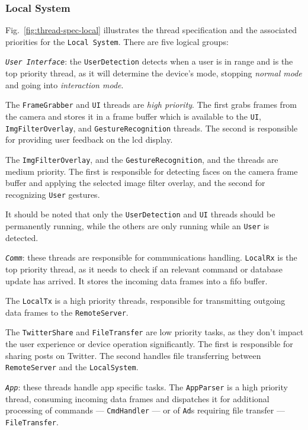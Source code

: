 \subsubsection{Local System}
\label{sec:local-system-2}
%
Fig.~\ref{fig:thread-spec-local} illustrates the thread specification and the
associated priorities for the \texttt{Local System}. There are five logical
groups:
\begin{enum-c}
\item
  \emph{\texttt{User Interface}}: the \texttt{UserDetection} detects when a user
  is in range and is the top priority
  thread, as it will determine the device's mode, stopping \emph{normal mode}
  and going into \emph{interaction mode}.

  The \texttt{FrameGrabber} and \texttt{UI} threads are \emph{high
    priority}. The first grabs frames from the camera and stores it in a frame
  buffer which is available to the \texttt{UI}, \texttt{ImgFilterOverlay}, and
  \texttt{GestureRecognition} threads. The second is
  responsible for providing user feedback on the \gls{lcd} display.

  The \texttt{ImgFilterOverlay}, and the \texttt{GestureRecognition}, and the
  threads are medium priority. The first is responsible
  for detecting faces on the camera frame buffer and applying the selected image
  filter overlay, and the second for recognizing \texttt{User} gestures.

  It should be noted that only the \texttt{UserDetection} and \texttt{UI}
  threads should be permanently running, while the others are only running while
  an \texttt{User} is detected.
\item
  \emph{\texttt{Comm}}: these threads are responsible for communications
  handling.
  \texttt{LocalRx} is the top priority thread, as it needs to check if an
  relevant command or database update has arrived. It stores the incoming data
  frames into a \gls{fifo} buffer.

  The \texttt{LocalTx} is a high priority threads, responsible for
  transmitting outgoing data frames to the \texttt{RemoteServer}.

  The \texttt{TwitterShare} and \texttt{FileTransfer} are low priority tasks, as
  they don't impact the user experience or device operation significantly. The
  first is responsible for sharing posts on Twitter. The second handles file
  transferring between \texttt{RemoteServer} and the \texttt{LocalSystem}.
\item
  \emph{\texttt{App}}: these threads handle app specific tasks.
  The \texttt{AppParser} is a high priority thread, consuming incoming data
  frames and dispatches it for additional processing of commands ---
  \texttt{CmdHandler} --- or of \texttt{Ad}s requiring file transfer ---
  \texttt{FileTransfer}.


\end{enum-c}
